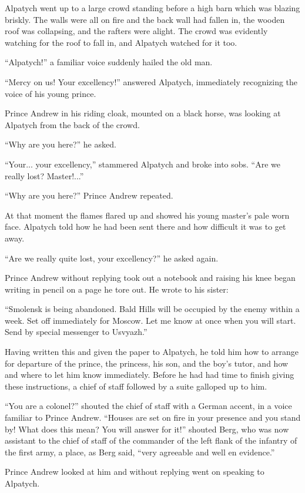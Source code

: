 Alpatych went up to a large crowd standing before a high barn
which was blazing briskly. The walls were all on fire and the
back wall had fallen in, the wooden roof was collapsing, and the
rafters were alight. The crowd was evidently watching for the
roof to fall in, and Alpatych watched for it too.

``Alpatych!'' a familiar voice suddenly hailed the old man.

``Mercy on us! Your excellency!'' answered Alpatych, immediately
recognizing the voice of his young prince.

Prince Andrew in his riding cloak, mounted on a black horse, was
looking at Alpatych from the back of the crowd.

``Why are you here?'' he asked.

``Your... your excellency,'' stammered Alpatych and broke into
sobs. ``Are we really lost? Master!...''

``Why are you here?'' Prince Andrew repeated.

At that moment the flames flared up and showed his young master's
pale worn face. Alpatych told how he had been sent there and how
difficult it was to get away.

``Are we really quite lost, your excellency?'' he asked again.

Prince Andrew without replying took out a notebook and raising
his knee began writing in pencil on a page he tore out. He wrote
to his sister:

``Smolensk is being abandoned. Bald Hills will be occupied by the
enemy within a week. Set off immediately for Moscow. Let me know
at once when you will start. Send by special messenger to
Usvyazh.''

Having written this and given the paper to Alpatych, he told him
how to arrange for departure of the prince, the princess, his
son, and the boy's tutor, and how and where to let him know
immediately. Before he had had time to finish giving these
instructions, a chief of staff followed by a suite galloped up to
him.

``You are a colonel?'' shouted the chief of staff with a German
accent, in a voice familiar to Prince Andrew. ``Houses are set on
fire in your presence and you stand by! What does this mean? You
will answer for it!''  shouted Berg, who was now assistant to the
chief of staff of the commander of the left flank of the infantry
of the first army, a place, as Berg said, ``very agreeable and
well en evidence.''

Prince Andrew looked at him and without replying went on speaking
to Alpatych.


